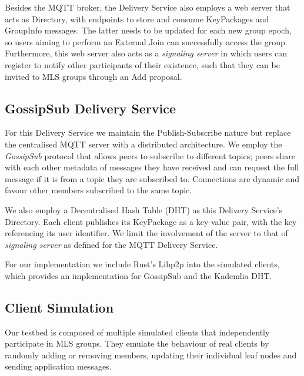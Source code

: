 \documentclass[preprint, 12pt]{elsarticle}
\begin{document}
Besides the MQTT broker, the Delivery Service also employs a web server that acts as Directory, with endpoints to store and consume KeyPackages and GroupInfo messages. The latter needs to be updated for each new group epoch, so users aiming to perform an External Join can successfully access the group. Furthermore, this web server also acts as a \textit{signaling server} in which users can register to notify other participants of their existence, such that they can be invited to MLS groups through an Add proposal.

\subsection{GossipSub Delivery Service}

For this Delivery Service we maintain the Publish-Subscribe nature but replace the centralised MQTT server with a distributed architecture. We employ the \textit{GossipSub} protocol \cite{gossipsub} that allows peers to subscribe to different topics; peers share with each other metadata of messages they have received and can request the full message if it is from a topic they are subscribed to. Connections are dynamic and favour other members subscribed to the same topic. 

We also employ a Decentralised Hash Table (DHT) as this Delivery Service's Directory. Each client publishes its KeyPackage as a key-value pair, with the key referencing its user identifier. We limit the involvement of the server to that of \textit{signaling server} as defined for the MQTT Delivery Service.

For our implementation we include Rust's Libp2p \cite{libp2p} into the simulated clients, which provides an implementation for GossipSub and the Kademlia \cite{kademlia} DHT.

\subsection{Client Simulation}

Our testbed is composed of multiple simulated clients that independently participate in MLS groups. They emulate the behaviour of real clients by randomly adding or removing members, updating their individual leaf nodes and sending application messages. 
\end{document}

